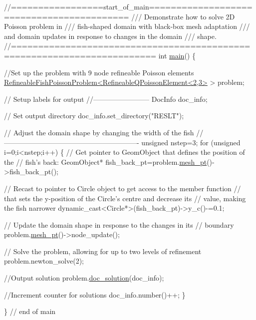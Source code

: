  
\begin{DoxyCodeInclude}
\textcolor{comment}{//=================start\_of\_main==========================================}
\textcolor{comment}{/// Demonstrate how to solve 2D Poisson problem in }
\textcolor{comment}{}\textcolor{comment}{/// fish-shaped domain with black-box mesh adaptation}
\textcolor{comment}{}\textcolor{comment}{/// and domain updates in response to changes in the domain}
\textcolor{comment}{}\textcolor{comment}{/// shape.}
\textcolor{comment}{}\textcolor{comment}{//========================================================================}
\textcolor{keywordtype}{int} \hyperlink{fish__domain_8cc_ae66f6b31b5ad750f1fe042a706a4e3d4}{main}()
\{

 \textcolor{comment}{//Set up the problem with 9 node refineable Poisson elements}
 \hyperlink{classRefineableFishPoissonProblem}{RefineableFishPoissonProblem<RefineableQPoissonElement<2,3>}
       > problem;
 
 \textcolor{comment}{// Setup labels for output}
 \textcolor{comment}{//------------------------}
 DocInfo doc\_info;
 
 \textcolor{comment}{// Set output directory}
 doc\_info.set\_directory(\textcolor{stringliteral}{"RESLT"}); 
 
 \textcolor{comment}{// Adjust the domain shape by changing the width of the fish}
 \textcolor{comment}{//----------------------------------------------------------}
 \textcolor{keywordtype}{unsigned} nstep=3;
 \textcolor{keywordflow}{for} (\textcolor{keywordtype}{unsigned} i=0;i<nstep;i++)
  \{
   \textcolor{comment}{// Get pointer to GeomObject that defines the position of the}
   \textcolor{comment}{// fish's back:}
   GeomObject* fish\_back\_pt=problem.\hyperlink{classRefineableFishPoissonProblem_a803c9050b07b35aba22f08a5a9e59f2c}{mesh\_pt}()->fish\_back\_pt();

   \textcolor{comment}{// Recast to pointer to Circle object to get access to the member function}
   \textcolor{comment}{// that sets the y-position of the Circle's centre and decrease its}
   \textcolor{comment}{// value, making the fish narrower}
   \textcolor{keyword}{dynamic\_cast<}Circle*\textcolor{keyword}{>}(fish\_back\_pt)->y\_c()-=0.1;
   
   \textcolor{comment}{// Update the domain shape in response to the changes in its}
   \textcolor{comment}{// boundary}
   problem.\hyperlink{classRefineableFishPoissonProblem_a803c9050b07b35aba22f08a5a9e59f2c}{mesh\_pt}()->node\_update();

   \textcolor{comment}{// Solve the problem, allowing for up to two levels of refinement}
   problem.newton\_solve(2);
   
   \textcolor{comment}{//Output solution}
   problem.\hyperlink{classRefineableFishPoissonProblem_aeee1bf23216971b50b8822c45e62c48b}{doc\_solution}(doc\_info);
   
   \textcolor{comment}{//Increment counter for solutions }
   doc\_info.number()++;
  \}
 
\} \textcolor{comment}{// end of main}

\end{DoxyCodeInclude}


